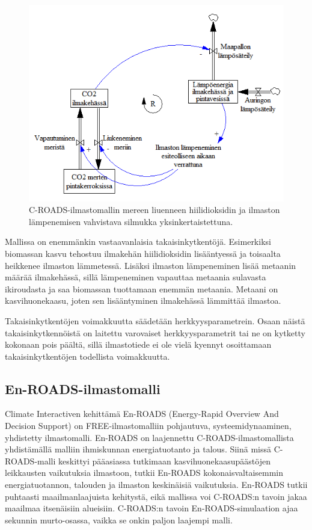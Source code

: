\documentclass[finnish,12pt,a4paper,pdftex]{article}
\begin{document}
\begin{onehalfspacing}
\begin{figure}[ht]
\centering \includegraphics[width=\textwidth]{c-roads-co2-lampo}
\caption{C-ROADS-ilmastomallin mereen liuenneen hiilidioksidin ja ilmaston lämpenemisen vahvistava silmukka yksinkertaistettuna. \cite{Croads} \label{ilmasto:co2-lampo}}
\end{figure}

Mallissa on enemmänkin vastaavanlaisia takaisinkytkentöjä. Esimerkiksi biomassan kasvu tehostuu ilmakehän hiilidioksidin lisääntyessä ja toisaalta heikkenee ilmaston lämmetessä. Lisäksi ilmaston lämpeneminen lisää metaanin määrää ilmakehässä, sillä lämpeneminen vapauttaa metaania sulavasta ikiroudasta ja saa biomassan tuottamaan enemmän metaania. Metaani on kasvihuonekaasu, joten sen lisääntyminen ilmakehässä lämmittää ilmastoa. \cite{CroadsFlightSimulator2011}

Takaisinkytkentöjen voimakkuutta säädetään herkkyysparametrein. Osaan näistä takaisinkytkennöistä on laitettu varovaiset herkkyysparametrit tai ne on kytketty kokonaan pois päältä, sillä ilmastotiede ei ole vielä kyennyt osoittamaan takaisinkytkentöjen todellista voimakkuutta. \cite{CroadsFlightSimulator2011}

\subsection{En-ROADS-ilmastomalli \label{ilmasto:enroads}}

Climate Interactiven kehittämä En-ROADS (Energy-Rapid Overview And Decision Support) on FREE-ilmastomalliin pohjautuva, systeemidynaaminen, yhdistetty ilmastomalli. En-ROADS on laajennettu C-ROADS-ilmastomallista yhdistämällä malliin ihmiskunnan energiatuotanto ja talous. Siinä missä C-ROADS-malli keskittyi pääasiassa tutkimaan kasvihuonekaasupäästöjen leikkausten vaikutuksia ilmastoon, tutkii En-ROADS kokonaisvaltaisemmin energiatuotannon, talouden ja ilmaston keskinäisiä vaikutuksia. En-ROADS tutkii puhtaasti maailmanlaajuista kehitystä, eikä mallissa voi C-ROADS:n tavoin jakaa maailmaa itsenäisiin alueisiin. C-ROADS:n tavoin En-ROADS-simulaation ajaa sekunnin murto-osassa, vaikka se onkin paljon laajempi malli. \cite{EnroadsWWW, Harvey2013, Enroads} 


\end{onehalfspacing}
\end{document}
